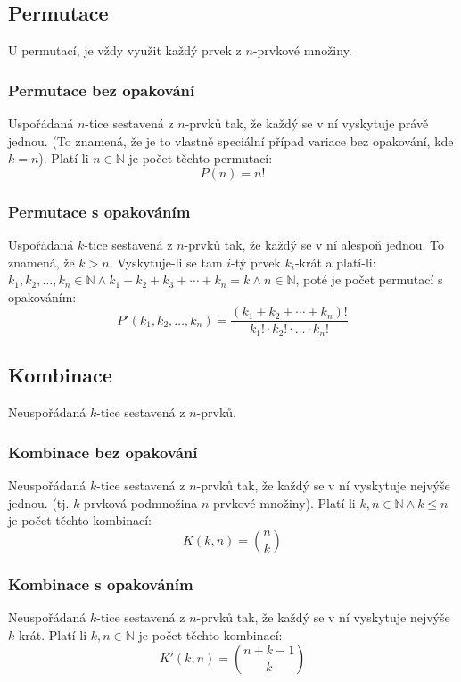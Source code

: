 \documentclass[12pt]{article}
\begin{document}
\subsection{Permutace}
U permutací, je vždy využit každý prvek z $n$-prvkové množiny.
\subsubsection{Permutace bez opakování}
Uspořádaná $n$-tice sestavená z $n$-prvků tak, že každý se v ní vyskytuje právě jednou. (To znamená, že je to vlastně speciální případ variace bez opakování, kde $k=n$). Platí-li $n \in \mathbb{N}$ je počet těchto permutací:
\begin{equation}
P(n) = n!
\end{equation}
\subsubsection{Permutace s opakováním}
Uspořádaná $k$-tice sestavená z $n$-prvků tak, že každý se v ní alespoň jednou. To znamená, že $k >n$.
Vyskytuje-li se tam $i$-tý prvek $k_i$-krát a platí-li: $k_1, k_2, \dotsc, k_n \in \mathbb{N} \land k_1 + k_2 + k_3 + \dotsb + k_n = k \land n \in \mathbb{N}$, poté je počet permutací s opakováním:
\begin{equation}
P'\left(k_1,k_2, \dotsc, k_n \right) = \frac{\left( k_1 + k_2 + \dotsb + k_n \right)!}{k_1! \cdot k_2 ! \cdot \dotso \cdot k_n!}
\end{equation}

\subsection{Kombinace}
Neuspořádaná $k$-tice sestavená z $n$-prvků.
\subsubsection{Kombinace bez opakování}
\label{sec:kombinace-bez}
Neuspořádaná $k$-tice sestavená z $n$-prvků tak, že každý se v ní vyskytuje nejvýše jednou. (tj. $k$-prvková podmnožina $n$-prvkové množiny). Platí-li $k,n \in \mathbb{N} \land k \leq n$ je počet těchto kombinací:
\begin{equation}
K\left(k,n\right) = \binom{n}{k}
\end{equation}
\subsubsection{Kombinace s opakováním}
Neuspořádaná $k$-tice sestavená z $n$-prvků tak, že každý se v ní vyskytuje nejvýše $k$-krát. Platí-li $k,n \in \mathbb{N}$ je počet těchto kombinací:
\begin{equation}
K' \left(k,n\right) = \binom{n+k-1}{k}
\end{equation}
\end{document}
